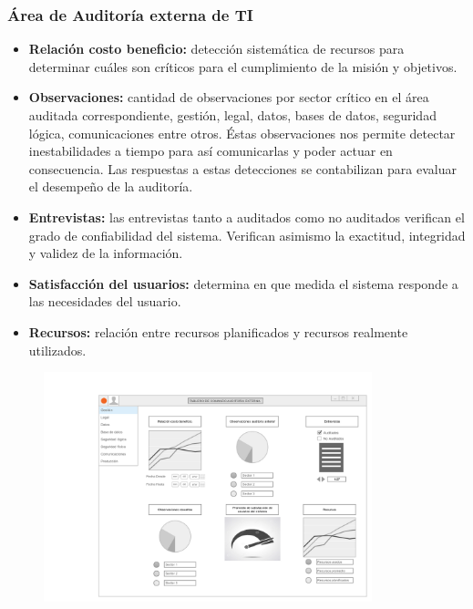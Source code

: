     \subsubsection{Área de Auditoría externa de TI}
    	\begin{itemize}
        	\item\textbf{Relación costo beneficio: }detección sistemática de recursos para determinar cuáles son críticos para el cumplimiento de la misión y objetivos.
            \item\textbf{Observaciones: } cantidad de observaciones por sector crítico en el área auditada correspondiente, gestión, legal, datos, bases de datos, seguridad lógica, comunicaciones entre otros. Éstas observaciones nos permite detectar inestabilidades a tiempo para así comunicarlas y poder actuar en consecuencia. Las respuestas a estas detecciones se contabilizan para evaluar el desempeño de la auditoría.
            \item\textbf{Entrevistas: } las entrevistas tanto a auditados como no auditados verifican el grado de confiabilidad del sistema. Verifican asimismo la exactitud, integridad y validez de la información.
			\item\textbf{Satisfacción del usuarios: } determina en que medida el sistema responde a las necesidades del usuario.
            \item\textbf{Recursos: } relación entre recursos planificados y recursos realmente utilizados.
		\end{itemize}    
    
    \begin{figure}[h]
	  \centering
  	  \includegraphics[width=0.85\textwidth]{img/tp2_integrador/auditoria_externa}
      \label{Auditoría externa}
	\end{figure}
    
